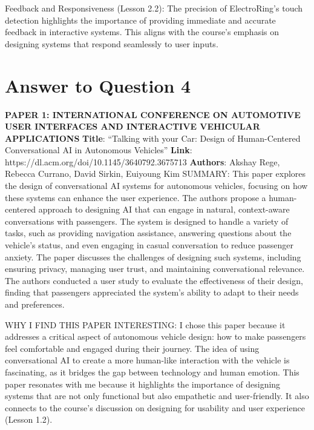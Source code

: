 \documentclass[
	letterpaper, %
]{jdf}
\begin{document}
Feedback and Responsiveness (Lesson 2.2): The precision of ElectroRing’s touch detection highlights the importance of providing immediate and accurate feedback in interactive systems. This aligns with the course’s emphasis on designing systems that respond seamlessly to user inputs.

\hfill \break  

\section{Answer to Question 4} 
\textbf{PAPER 1: INTERNATIONAL CONFERENCE ON AUTOMOTIVE USER INTERFACES AND INTERACTIVE VEHICULAR APPLICATIONS} 
\newline \textbf{Title}: “Talking with your Car: Design of Human-Centered Conversational AI in Autonomous Vehicles”
\newline \textbf{Link}: https://dl.acm.org/doi/10.1145/3640792.3675713
\newline \textbf{Authors}: Akshay Rege, Rebecca Currano, David Sirkin, Euiyoung Kim
\newline SUMMARY:
This paper explores the design of conversational AI systems for autonomous vehicles, focusing on how these systems can enhance the user experience. The authors propose a human-centered approach to designing AI that can engage in natural, context-aware conversations with passengers. The system is designed to handle a variety of tasks, such as providing navigation assistance, answering questions about the vehicle’s status, and even engaging in casual conversation to reduce passenger anxiety. The paper discusses the challenges of designing such systems, including ensuring privacy, managing user trust, and maintaining conversational relevance. The authors conducted a user study to evaluate the effectiveness of their design, finding that passengers appreciated the system’s ability to adapt to their needs and preferences.

WHY I FIND THIS PAPER INTERESTING:
I chose this paper because it addresses a critical aspect of autonomous vehicle design: how to make passengers feel comfortable and engaged during their journey. The idea of using conversational AI to create a more human-like interaction with the vehicle is fascinating, as it bridges the gap between technology and human emotion. This paper resonates with me because it highlights the importance of designing systems that are not only functional but also empathetic and user-friendly. It also connects to the course’s discussion on designing for usability and user experience (Lesson 1.2).
\end{document}
